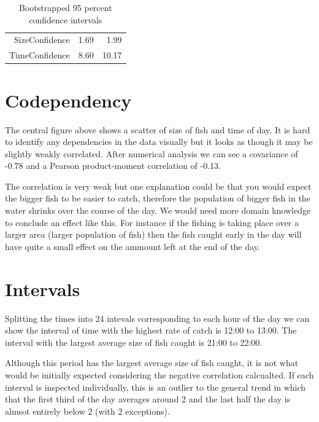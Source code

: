 \documentclass{article}
\begin{document}
\begin{table}[ht]
\centering
\begin{tabular}{rrr}
  \hline
  \hline
SizeConfidence & 1.69 & 1.99 \\ 
  TimeConfidence & 8.60 & 10.17 \\ 
   \hline
\end{tabular}
\caption{Bootstrapped 95 percent confidence intervals} 
\end{table}
\section{Codependency}

The central figure above shows a scatter of size of fish and time of day. It is hard to identify any dependencies in the data visually but it looks as though it may be slightly weakly correlated. After numerical analysis we can see a covariance of -0.78 and a Pearson product-moment correlation of -0.13.

The correlation is very weak but one explanation could be that you would expect the bigger fish to be easier to catch, therefore the population of bigger fish in the water shrinks over the course of the day. We would need more domain knowledge to conclude an effect like this. For instance if the fishing is taking place over a larger area (larger population of fish) then the fish caught early in the day will have quite a small effect on the ammount left at the end of the day. 

\section{Intervals}

Splitting the times into 24 intevals corresponding to each hour of the day we can show the interval of time with the highest rate of catch is 12:00 to  13:00. The interval with the largest average size of fish caught is 21:00 to 22:00. 

Although this period has the largest average size of fish caught, it is not what would be initially expected considering the negative correlation calcualted. If each interval is inspected individually, this is an outlier to the general trend in which that the first third of the day averages around 2 and the last half the day is almsot entirely below 2 (with 2 exceptions). 
\end{document}
